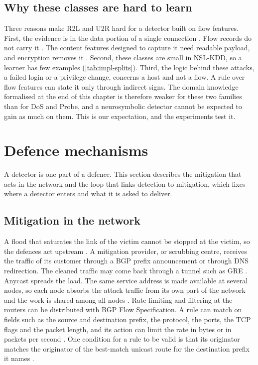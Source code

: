 \subsection{Why these classes are hard to learn}
\label{sec:r2l-u2r-hard}

Three reasons make R2L and U2R hard for a detector built on flow features.
First, the evidence is in the data portion of a single connection
\citep{kddcup1999task,tavallaee2009kddcup99}. Flow records do not carry it
\citep{sperotto2010flowbased}. The content features designed to capture it
need readable payload, and encryption removes it
\citep{tavallaee2009kddcup99,moriarty2018rfc8404}. Second, these classes are
small in NSL-KDD, so a learner has few examples (\cref{tab:impl-splits}).
Third, the logic behind these attacks, a failed login or a privilege change,
concerns a host and not a flow. A rule over flow features can state it only
through indirect signs. The domain knowledge formalised at the end of this
chapter is therefore weaker for these two families than for DoS and Probe, and a
neurosymbolic detector cannot be expected to gain as much on them. This is
our expectation, and the experiments test it.

\section{Defence mechanisms}
\label{sec:defences}

A detector is one part of a defence. This section describes the mitigation that acts in the
network and the loop that links detection to mitigation, which fixes where a detector enters
and what it is asked to deliver.

\subsection{Mitigation in the network}
\label{sec:mitigation-mechanisms}

A flood that saturates the link of the victim cannot be stopped at the
victim, so the defences act upstream \citep{handley2006rfc4732}. A mitigation
provider, or scrubbing centre, receives the traffic of its customer through a
BGP prefix announcement or through DNS redirection. The cleaned traffic may
come back through a tunnel such as GRE \citep{dobbins2021rfc8903}. Anycast
spreads the load. The same service address is made available at several
nodes, so each node absorbs the attack traffic from its own part of the
network and the work is shared among all nodes \citep{abley2006rfc4786}. Rate
limiting and filtering at the routers can be distributed with BGP Flow
Specification. A rule can match on fields such as the source and destination
prefix, the protocol, the ports, the TCP flags and the packet length, and its
action can limit the rate in bytes or in packets per second
\citep{loibl2020rfc8955}. One condition for a rule to be valid is that its
originator matches the originator of the best-match unicast route for the
destination prefix it names \citep{loibl2020rfc8955}.

